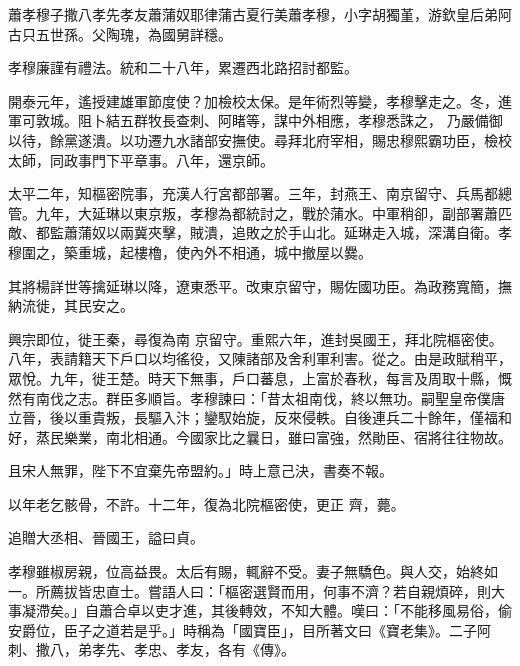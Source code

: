 
\begin{pinyinscope}

 蕭孝穆子撒八孝先孝友蕭蒲奴耶律蒲古夏行美蕭孝穆，小字胡獨堇，游欽皇后弟阿古只五世孫。父陶瑰，為國舅詳穩。



 孝穆廉謹有禮法。統和二十八年，累遷西北路招討都監。



 開泰元年，遙授建雄軍節度使？加檢校太保。是年術烈等變，孝穆擊走之。冬，進軍可敦城。阻卜結五群牧長查刺、阿睹等，謀中外相應，孝穆悉誅之，
 乃嚴備御以待，餘黨遂潰。以功遷九水諸部安撫使。尋拜北府宰相，賜忠穆熙霸功臣，檢校太師，同政事門下平章事。八年，還京師。



 太平二年，知樞密院事，充漢人行宮都部署。三年，封燕王、南京留守、兵馬都總管。九年，大延琳以東京叛，孝穆為都統討之，戰於蒲水。中軍稍卻，副部署蕭匹敵、都監蕭蒲奴以兩冀夾擊，賊潰，追敗之於手山北。延琳走入城，深溝自衛。孝穆圍之，築重城，起樓櫓，使內外不相通，城中撤屋以爨。



 其將楊詳世等擒延琳以降，遼東悉平。改東京留守，賜佐國功臣。為政務寬簡，撫納流徙，其民安之。



 興宗即位，徙王秦，尋復為南
 京留守。重熙六年，進封吳國王，拜北院樞密使。八年，表請籍天下戶口以均徭役，又陳諸部及舍利軍利害。從之。由是政賦稍平，眾悅。九年，徙王楚。時天下無事，戶口蕃息，上富於春秋，每言及周取十縣，慨然有南伐之志。群臣多順旨。孝穆諫曰：「昔太祖南伐，終以無功。嗣聖皇帝僕唐立晉，後以重貴叛，長驅入汴；鑾馭始旋，反來侵軼。自後連兵二十餘年，僅福和好，蒸民樂業，南北相通。今國家比之曩日，雖曰富強，然勛臣、宿將往往物故。



 且宋人無罪，陛下不宜棄先帝盟約。」時上意己決，書奏不報。



 以年老乞骸骨，不許。十二年，復為北院樞密使，更正
 齊，薨。



 追贈大丞相、晉國王，謚曰貞。



 孝穆雖椒房親，位高益畏。太后有賜，輒辭不受。妻子無驕色。與人交，始終如一。所薦拔皆忠直士。嘗語人曰：「樞密選賢而用，何事不濟？若自親煩碎，則大事凝滯矣。」自蕭合卓以吏才進，其後轉效，不知大體。嘆曰：「不能移風易俗，偷安爵位，臣子之道若是乎。」時稱為「國寶臣」，目所著文曰《寶老集》。二子阿刺、撒八，弟孝先、孝忠、孝友，各有《傳》。




\end{pinyinscope}
